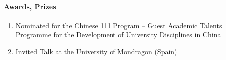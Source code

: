 \paragraph{Awards, Prizes}
\begin{enumerate}
\item Nominated for the Chinese 111 Program -- Guest Academic Talents Programme for the Development of University Disciplines in China
\item Invited Talk at the University of Mondragon (Spain)
\end{enumerate}

\newpage

\nocite{ah06_vis_light}
\nocite{bh06_ped_dead_reck}
\nocite{hnona06_iamac}
\nocite{vh06_thru_cap}
\nocite{cvh06_freq_syn}
\nocite{feh06_semi_analytic}
\nocite{fagvh06_sch_CDMA}
\nocite{jhm06_adhoc_tdd_underlay}
\nocite{oha06_tsalloc_insotdd}
\nocite{mhay06_spatialmod}
\nocite{asilomar06}
\nocite{chinacom06}
\nocite{tdd_book}
\nocite{oha07}

%
%
%

